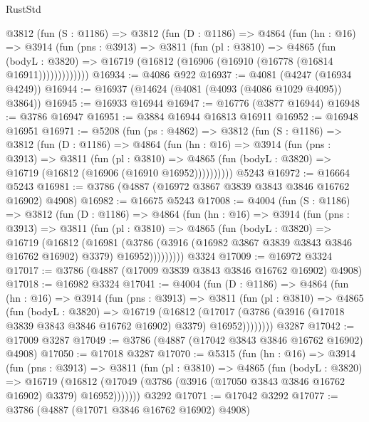 \begin{lexlean}{RustStd}
\begin{coremodule}
      @3812
        (fun (S : @1186) =>
        @3812
          (fun (D : @1186) =>
          @4864
            (fun (hn : @16) =>
            @3914
              (fun (pns : @3913) =>
              @3811
                (fun (pl : @3810) =>
                @4865
                  (fun (bodyL : @3820) =>
                  @16719 (@16812 (@16906 (@16910 (@16778 (@16814 @16911)))))))))))))
@16934 := @4086 @922
@16937 := @4081 (@4247 (@16934 @4249))
@16944 := @16937 (@14624 (@4081 (@4093 (@4086 @1029 @4095)) @3864))
@16945 := @16933 @16944
@16947 := @16776 (@3877 @16944)
@16948 := @3786 @16947
@16951 := @3884 @16944 @16813 @16911
@16952 := @16948 @16951
@16971 := @5208
    (fun (ps : @4862) =>
    @3812
      (fun (S : @1186) =>
      @3812
        (fun (D : @1186) =>
        @4864
          (fun (hn : @16) =>
          @3914
            (fun (pns : @3913) =>
            @3811
              (fun (pl : @3810) =>
              @4865 (fun (bodyL : @3820) => @16719 (@16812 (@16906 (@16910 @16952))))))))))
    @5243
@16972 := @16664 @5243
@16981 := @3786 (@4887 (@16972 @3867 @3839 @3843 @3846 @16762 @16902) @4908)
@16982 := @16675 @5243
@17008 := @4004
    (fun (S : @1186) =>
    @3812
      (fun (D : @1186) =>
      @4864
        (fun (hn : @16) =>
        @3914
          (fun (pns : @3913) =>
          @3811
            (fun (pl : @3810) =>
            @4865
              (fun (bodyL : @3820) =>
              @16719
                (@16812
                  (@16981
                    (@3786
                      (@3916 (@16982 @3867 @3839 @3843 @3846 @16762 @16902) @3379)
                      @16952)))))))))
    @3324
@17009 := @16972 @3324
@17017 := @3786 (@4887 (@17009 @3839 @3843 @3846 @16762 @16902) @4908)
@17018 := @16982 @3324
@17041 := @4004
    (fun (D : @1186) =>
    @4864
      (fun (hn : @16) =>
      @3914
        (fun (pns : @3913) =>
        @3811
          (fun (pl : @3810) =>
          @4865
            (fun (bodyL : @3820) =>
            @16719
              (@16812
                (@17017 (@3786 (@3916 (@17018 @3839 @3843 @3846 @16762 @16902) @3379) @16952))))))))
    @3287
@17042 := @17009 @3287
@17049 := @3786 (@4887 (@17042 @3843 @3846 @16762 @16902) @4908)
@17050 := @17018 @3287
@17070 := @5315
    (fun (hn : @16) =>
    @3914
      (fun (pns : @3913) =>
      @3811
        (fun (pl : @3810) =>
        @4865
          (fun (bodyL : @3820) =>
          @16719
            (@16812 (@17049 (@3786 (@3916 (@17050 @3843 @3846 @16762 @16902) @3379) @16952)))))))
    @3292
@17071 := @17042 @3292
@17077 := @3786 (@4887 (@17071 @3846 @16762 @16902) @4908)

\end{coremodule}
\end{lexlean}
